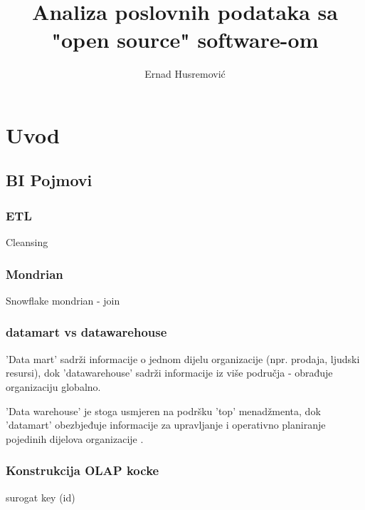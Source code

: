 \documentclass[times, utf8, seminar]{fit}
\begin{document}
\title{Analiza poslovnih podataka sa "open source" software-om}

\author{Ernad Husremović}


\maketitle

\tableofcontents

\chapter{Uvod}

\section{BI Pojmovi}

\subsection{ETL}

Cleansing

\subsection{Mondrian}

Snowflake mondrian - join

\cite{web:pentaho:mondrian_schema}

\subsection{datamart vs datawarehouse}

'Data mart' sadrži informacije o jednom dijelu organizacije (npr. prodaja, ljudski resursi), dok 'datawarehouse' sadrži informacije iz više područja -  obrađuje organizaciju globalno. 

'Data warehouse' je stoga usmjeren na podršku 'top' menadžmenta, dok 'datamart' obezbjeđuje informacije za upravljanje i operativno planiranje pojedinih dijelova organizacije  \cite[str.~391]{pentaho32}.

\subsection{Konstrukcija OLAP kocke}

surogat key (id)
\end{document}
